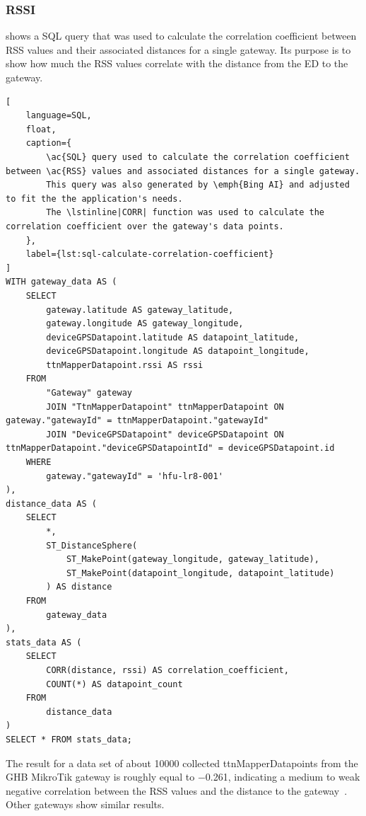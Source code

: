\subsubsection{\acl{RSSI}}

 shows a \ac{SQL} query that was used to calculate the correlation coefficient between \ac{RSS} values and their associated distances for a single gateway.
Its purpose is to show how much the \ac{RSS} values correlate with the distance from the \acl{ED} to the gateway.

\begin{lstlisting}[
    language=SQL,
    float,
    caption={
        \ac{SQL} query used to calculate the correlation coefficient between \ac{RSS} values and associated distances for a single gateway.
        This query was also generated by \emph{Bing AI} and adjusted to fit the the application's needs.
        The \lstinline|CORR| function was used to calculate the correlation coefficient over the gateway's data points.
    },
    label={lst:sql-calculate-correlation-coefficient}
]
WITH gateway_data AS (
    SELECT
        gateway.latitude AS gateway_latitude,
        gateway.longitude AS gateway_longitude,
        deviceGPSDatapoint.latitude AS datapoint_latitude,
        deviceGPSDatapoint.longitude AS datapoint_longitude,
        ttnMapperDatapoint.rssi AS rssi
    FROM
        "Gateway" gateway
        JOIN "TtnMapperDatapoint" ttnMapperDatapoint ON gateway."gatewayId" = ttnMapperDatapoint."gatewayId"
        JOIN "DeviceGPSDatapoint" deviceGPSDatapoint ON ttnMapperDatapoint."deviceGPSDatapointId" = deviceGPSDatapoint.id
    WHERE
        gateway."gatewayId" = 'hfu-lr8-001'
),
distance_data AS (
    SELECT
        *,
        ST_DistanceSphere(
            ST_MakePoint(gateway_longitude, gateway_latitude),
            ST_MakePoint(datapoint_longitude, datapoint_latitude)
        ) AS distance
    FROM
        gateway_data
),
stats_data AS (
    SELECT
        CORR(distance, rssi) AS correlation_coefficient,
		COUNT(*) AS datapoint_count
    FROM
        distance_data
)
SELECT * FROM stats_data;
\end{lstlisting}

The result for a data set of about \num{10000} collected ttnMapperDatapoints from the \ac{GHB} MikroTik gateway is roughly equal to \num{-0.261}, indicating a medium to weak negative correlation between the \ac{RSS} values and the distance to the gateway~\cite{taylor_interpretation_1990}.
Other gateways show similar results.

